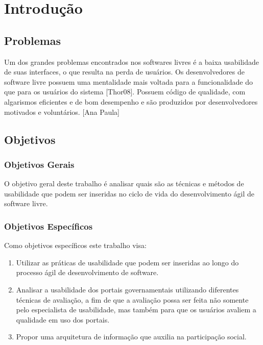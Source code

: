 \chapter{Introdução}

\section{Problemas}
Um dos grandes problemas encontrados nos softwares livres é a baixa usabilidade de suas interfaces, o que resulta na perda de usuários. 
Os desenvolvedores de software livre possuem uma mentalidade mais voltada para a funcionalidade do que para os usuários do sistema [Thor08]. Possuem código de qualidade, com algarismos eficientes e de bom desempenho e são produzidos por desenvolvedores motivados e voluntários. [Ana Paula]

\section{Objetivos}

\subsection{Objetivos Gerais}

O objetivo geral deste trabalho é analisar quais são as técnicas e métodos de usabilidade que podem ser inseridas no ciclo de vida do desenvolvimento ágil de software livre. 

\subsection{Objetivos Específicos}

Como objetivos específicos este trabalho visa:

\begin{enumerate}

\item Utilizar as práticas de usabilidade que podem ser inseridas ao longo do processo  ágil de desenvolvimento de software.
\item Analisar a usabilidade dos portais governamentais utilizando diferentes técnicas de avaliação, a fim de que a avaliação possa ser feita não somente pelo especialista de usabilidade, mas também para que os usuários avaliem a qualidade em uso dos portais.
\item Propor uma arquitetura de informação que auxilia na participação social.

\end{enumerate}


